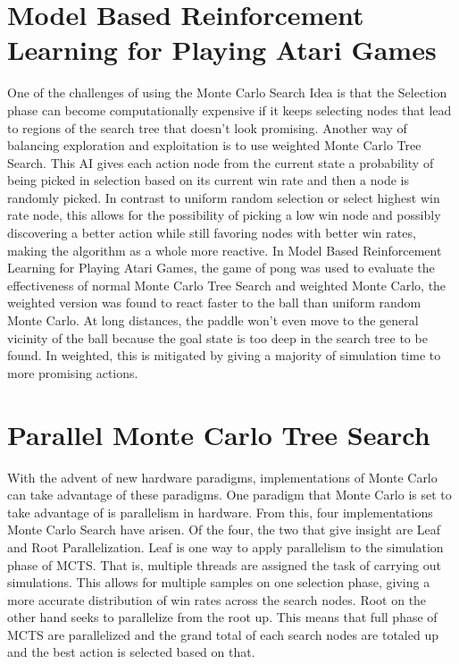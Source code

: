\documentclass[11pt]{article}
\begin{document}
\section{Model Based Reinforcement Learning for Playing Atari Games}

One of the challenges of using the Monte Carlo Search Idea is that the Selection phase can become computationally expensive if it keeps selecting nodes that lead to regions of the search tree that doesn't look promising. Another way of balancing exploration and exploitation is to use weighted Monte Carlo Tree Search. This AI gives each action node from the current state a probability of being picked in selection based on its current win rate and then a node is randomly picked. In contrast to uniform random selection or select highest win rate node, this allows for the possibility of picking a low win node and possibly discovering a better action while still favoring nodes with better win rates, making the algorithm as a whole more reactive. In Model Based Reinforcement Learning for Playing Atari Games, the game of pong was used to evaluate the effectiveness of normal Monte Carlo Tree Search and weighted Monte Carlo, the weighted version was found to react faster to the ball than uniform random Monte Carlo. \cite{fumodel} At long distances, the paddle won’t even move to the general vicinity of the ball because the goal state is too deep in the search tree to be found. In weighted, this is mitigated by giving a majority of simulation time to more promising actions.

\section{Parallel Monte Carlo Tree Search}

With the advent of new hardware paradigms, implementations of Monte Carlo can take advantage of these paradigms. One paradigm that Monte Carlo is set to take advantage of is parallelism in hardware. From this, four implementations Monte Carlo Search have arisen. Of the four, the two that give insight are Leaf and Root Parallelization.\cite{chaslot2008parallel} Leaf is one way to apply parallelism to the simulation phase of MCTS. That is, multiple threads are assigned the task of carrying out simulations. This allows for multiple samples on one selection phase, giving a more accurate distribution of win rates across the search nodes. Root on the other hand seeks to parallelize from the root up. This means that full phase of MCTS are parallelized and the grand total of each search nodes are totaled up and the best action is selected based on that. 
\end{document}
